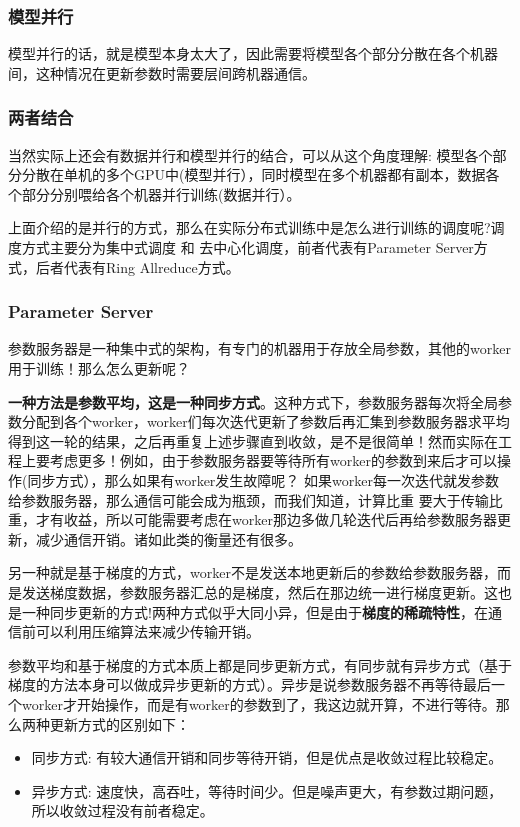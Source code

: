 \documentclass[12pt]{article}
\begin{document}
\subsubsection{模型并行}
模型并行的话，就是模型本身太大了，因此需要将模型各个部分分散在各个机器间，这种情况在更新参数时需要层间跨机器通信。


\subsubsection{两者结合}
当然实际上还会有数据并行和模型并行的结合，可以从这个角度理解: 模型各个部分分散在单机的多个GPU中(模型并行），同时模型在多个机器都有副本，数据各个部分分别喂给各个机器并行训练(数据并行）。

上面介绍的是并行的方式，那么在实际分布式训练中是怎么进行训练的调度呢?调度方式主要分为集中式调度 和 去中心化调度，前者代表有Parameter Server方式，后者代表有Ring Allreduce方式。

\subsubsection{Parameter Server}
参数服务器是一种集中式的架构，有专门的机器用于存放全局参数，其他的worker用于训练！那么怎么更新呢？

\textbf{一种方法是参数平均，这是一种同步方式}。这种方式下，参数服务器每次将全局参数分配到各个worker，worker们每次迭代更新了参数后再汇集到参数服务器求平均得到这一轮的结果，之后再重复上述步骤直到收敛，是不是很简单！然而实际在工程上要考虑更多！例如，由于参数服务器要等待所有worker的参数到来后才可以操作(同步方式），那么如果有worker发生故障呢？ 如果worker每一次迭代就发参数给参数服务器，那么通信可能会成为瓶颈，而我们知道，计算比重 要大于传输比重，才有收益，所以可能需要考虑在worker那边多做几轮迭代后再给参数服务器更新，减少通信开销。诸如此类的衡量还有很多。

另一种就是基于梯度的方式，worker不是发送本地更新后的参数给参数服务器，而是发送梯度数据，参数服务器汇总的是梯度，然后在那边统一进行梯度更新。这也是一种同步更新的方式!两种方式似乎大同小异，但是由于\textbf{梯度的稀疏特性}，在通信前可以利用压缩算法来减少传输开销。

参数平均和基于梯度的方式本质上都是同步更新方式，有同步就有异步方式（基于梯度的方法本身可以做成异步更新的方式）。异步是说参数服务器不再等待最后一个worker才开始操作，而是有worker的参数到了，我这边就开算，不进行等待。那么两种更新方式的区别如下：

\begin{itemize}
\setlength{\itemsep}{0pt}
\setlength{\parsep}{0pt}
\setlength{\parskip}{0pt}
    \item 同步方式: 有较大通信开销和同步等待开销，但是优点是收敛过程比较稳定。
    \item 异步方式: 速度快，高吞吐，等待时间少。但是噪声更大，有参数过期问题，所以收敛过程没有前者稳定。
\end{itemize}
\end{document}
